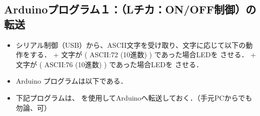 \documentclass[letterpaper,10pt,dvipdfmx]{sphinxmanual}
\begin{document}
\subsection{Arduinoプログラム１：（Lチカ：ON/OFF制御）の転送}
\label{\detokenize{epics/rst/example3__arduino_LEDcontrol01:arduino1-l-on-off}}\begin{itemize}
\item {} 
シリアル制御（USB）から、ASCII文字を受け取り、文字に応じて以下の動作をする．
+ 文字が  ( ASCII:72 (10進数) ) であった場合LEDを  させる．
+ 文字が  ( ASCII:76 (10進数) ) であった場合LEDを  させる．

\item {} 
Arduino プログラムは以下である．

\item {} 
下記プログラムは、 を使用してArduinoへ転送しておく．（手元PCからでも勿論、可）

\end{itemize}
\def\sphinxLiteralBlockLabel{\label{\detokenize{epics/rst/example3__arduino_LEDcontrol01:id6}}}
\end{document}
